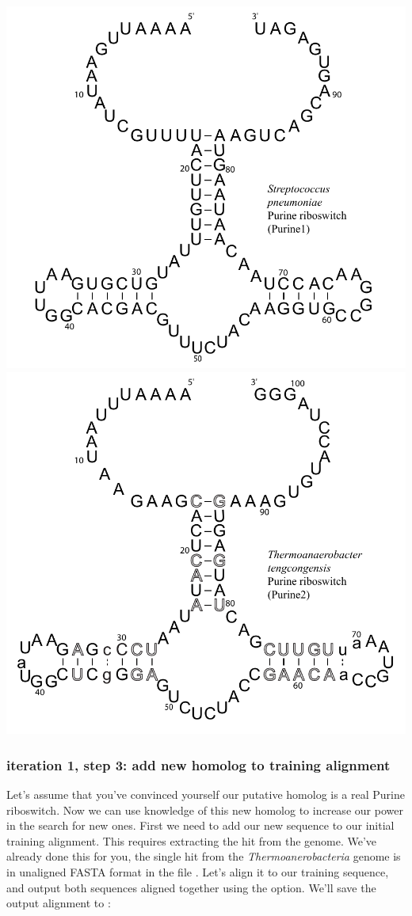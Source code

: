 \begin{center}
\includegraphics[scale=0.5]{Figures/purine1_full}
\includegraphics[scale=0.5]{Figures/purine2_full}
\end{center}

\subsubsection{iteration 1, step 3: add new homolog to training alignment}
Let's assume that you've convinced yourself our putative homolog is a real Purine
riboswitch. Now we can use knowledge of this new homolog to increase
our power in the search for new ones. First we need to add our new
sequence to our initial training alignment. This requires extracting
the hit from the genome. We've already done this for you, the single
hit from the \emph{Thermoanerobacteria} genome is in unaligned FASTA format
in the file . Let's align it to our training
sequence, and output both sequences aligned together using the
 option. We'll save the output alignment to
:


